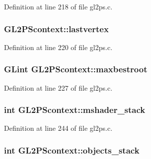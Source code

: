 Definition at line 218 of file gl2ps.\+c.

\hypertarget{struct_g_l2_p_scontext_a6f1db432d22f2fc5a3d8c7668fca1a29}{}
\subsubsection[{lastvertex}]{ G\+L2\+P\+Scontext\+::lastvertex}\label{struct_g_l2_p_scontext_a6f1db432d22f2fc5a3d8c7668fca1a29}


Definition at line 220 of file gl2ps.\+c.

\hypertarget{struct_g_l2_p_scontext_a0975ded6f444194578456f0b9186fbf9}{}
\subsubsection[{maxbestroot}]{\setlength{\rightskip}{0pt plus 5cm}G\+Lint G\+L2\+P\+Scontext\+::maxbestroot}\label{struct_g_l2_p_scontext_a0975ded6f444194578456f0b9186fbf9}


Definition at line 227 of file gl2ps.\+c.

\hypertarget{struct_g_l2_p_scontext_a46a14f06038a92b3cf5bb929b066a4b8}{}
\subsubsection[{mshader\+\_\+stack}]{\setlength{\rightskip}{0pt plus 5cm}int G\+L2\+P\+Scontext\+::mshader\+\_\+stack}\label{struct_g_l2_p_scontext_a46a14f06038a92b3cf5bb929b066a4b8}


Definition at line 244 of file gl2ps.\+c.

\hypertarget{struct_g_l2_p_scontext_a30c61b73e7387fe53aa24d7e56ccdb43}{}
\subsubsection[{objects\+\_\+stack}]{\setlength{\rightskip}{0pt plus 5cm}int G\+L2\+P\+Scontext\+::objects\+\_\+stack}\label{struct_g_l2_p_scontext_a30c61b73e7387fe53aa24d7e56ccdb43}


